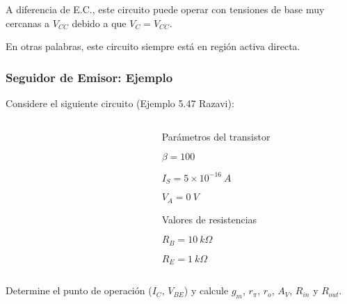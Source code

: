 \begin{frame}[t]
    \vspace{5mm}
    A diferencia de E.C., este circuito puede operar con tensiones de base muy cercanas a $V_{CC}$ debido a que $V_C = V_{CC}$.
    
    \vspace{3mm}
    En otras palabras, este circuito siempre está en región activa directa.
\end{frame}

\begin{frame}[t]
    \frametitle{Seguidor de Emisor: Ejemplo}

    Considere el siguiente circuito (Ejemplo 5.47 Razavi):

    \begin{columns}
        \begin{column}{0.66\textwidth}
            \begin{figure}[H]
            \end{figure}
        \end{column}
        \begin{column}{0.33\textwidth}
            Parámetros del transistor

            \vspace{3mm}
            $ \beta = 100 $
            
            $ I_S = 5\times 10^{-16}\ A $
            
            $ V_A = 0\ V $

            \vspace{5mm}
            Valores de resistencias

            \vspace{3mm}
            $ R_B = 10\ k\Omega $
            
            $ R_E = 1\ k\Omega $
        \end{column}
    \end{columns}

    \vspace{5mm}
    Determine el punto de operación ($I_C$, $V_{BE}$) y calcule $g_m$, $r_\pi$, $r_o$, $A_V$, $R_{in}$ y $R_{out}$.
\end{frame}

